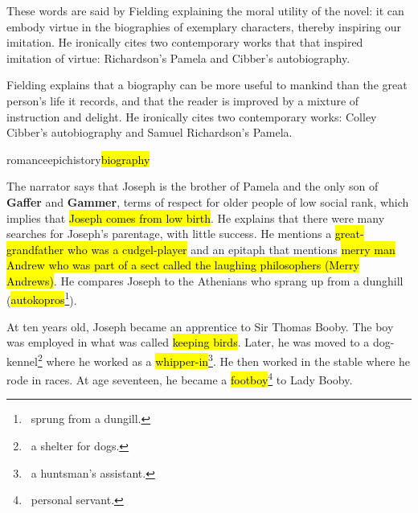 \documentclass[12pt, a4paper]{article}
\begin{document}


These words are said by Fielding explaining the moral utility of the novel:
it can embody virtue in the biographies of
exemplary characters, thereby inspiring our imitation. He ironically cites two contemporary works that 
that inspired imitation of virtue: Richardson’s Pamela and Cibber’s autobiography.


Fielding explains that a biography can be more
useful to mankind than the great person's life it records, and that the reader is
improved by a mixture of instruction and delight. He ironically cites two contemporary works: 
Colley Cibber’s autobiography and Samuel Richardson’s Pamela.

{romance}{epic}{history}{\hl{biography}}

\enlargethispage{2\baselineskip}

\ind The narrator says that Joseph is the brother of Pamela and the only son of \textbf{Gaffer} and \textbf{Gammer},
terms of respect for older people of low social rank, which implies that \hl{Joseph comes from low birth}.
He explains that there were many searches for Joseph’s parentage, with little success. He mentions
a \hl{great-grandfather who was a cudgel-player} and an epitaph that mentions \hl{merry man Andrew 
who was part of a sect called the laughing philosophers (Merry Andrews)}. He compares Joseph 
to the Athenians who sprang up from a dunghill (\hl{autokopros}\footnote{\, sprung from a dungill.}).


\ind At ten years old, Joseph became an apprentice to Sir Thomas Booby. The boy was employed in what 
was called \hl{keeping birds}. Later, he was moved to a dog-kennel\footnote{\, a shelter for dogs.
} where he worked as a \hl{whipper-in}\footnote{
\, a huntsman's assistant.}. He then worked in the stable where he rode in races. At age seventeen,
he became a \hl{footboy}\footnote{\, personal servant.} to Lady Booby.
\end{document}
